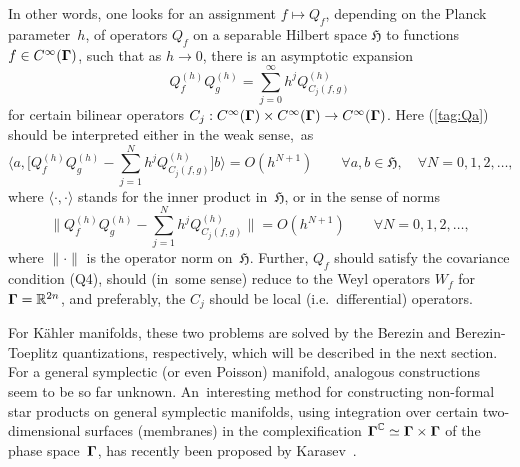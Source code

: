 \documentclass[12pt]{amsart}
\numberwithin{equation}{section}
\theoremstyle{remark}
\newcommand\spr[2]{\langle #1,#2\rangle}
\newcommand\h{^{(h)}}
\newcommand\Omg{{\bigam}}   %
\newcommand\HH{\mathfrak H}
\newcommand\RR{\mathbb R}
\newcommand{\CC}{\C}
\newcommand{\bigam}{\mbox{\boldmath $\Gamma$}}
\newcommand{\C}{\mathbb C}
\begin{document}
In other words, one looks for an assignment $f\mapsto Q_f$, depending on the
Planck parameter~$h$, of operators $Q_f$ on a separable Hilbert space $\HH$ to
functions $f\in C^\infty(\Omg)$, such that as $h\to0$, there is an asymptotic
expansion
\begin{equation}  Q\h_f Q\h_g = \sum_{j=0}^\infty h^j Q\h_{C_j(f,g)}
\label{tag:Qa}  \end{equation}
for certain bilinear operators $C_j:C^\infty(\Omg)\times C^\infty(\Omg)\to
C^\infty(\Omg)$. Here (\ref{tag:Qa}) should be interpreted either in the weak
sense,~as
$$ \Big\langle a,\Big[ Q\h_f Q\h_g - \sum_{j=1}^N h^j Q\h_{C_j(f,g)} \Big]b
\Big\rangle = O(h^{N+1}) \qquad\forall a,b\in\HH,\quad\forall N=0,1,2,\dots, $$
where $\spr\cdot\cdot$ stands for the inner product in~$\HH$, or in the sense
of norms
$$ \Big\| Q\h_f Q\h_g - \sum_{j=1}^N h^j Q\h_{C_j(f,g)} \Big\| = O(h^{N+1})
\qquad \forall N=0,1,2,\dots,  $$
where $\|\cdot\|$ is the operator norm on~$\HH$. Further, $Q_f$ should satisfy
the covariance condition (Q4), should (in~some sense) reduce to the Weyl
operators $W_f$ for $\Omg=\RR^{2n}$, and preferably, the $C_j$ should be
local (i.e.~differential) operators.

For K\"ahler manifolds, these two problems are solved by the Berezin and
Berezin-Toeplitz quantizations, respectively, which will be described
in the next section. For a general symplectic (or even Poisson) manifold,
analogous constructions seem to be so far unknown. An~interesting method for
constructing non-formal star products on general symplectic manifolds,
using integration over certain two-dimensional surfaces (membranes) in the
complexification $\Omg^\CC \simeq \Omg\times \Omg$ of the phase space~$\Omg$,
has recently been proposed by Karasev~\cite{bib:Karas}.
\end{document}
